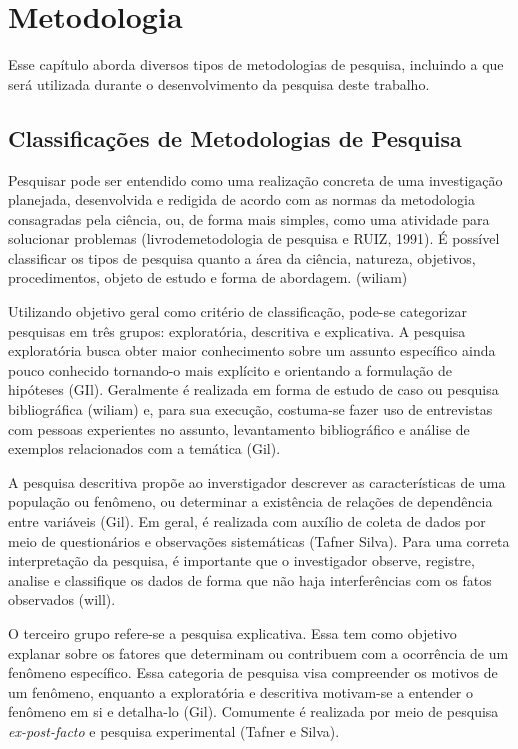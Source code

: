 \chapter[Metodologia]{Metodologia}

Esse capítulo aborda diversos tipos de metodologias de pesquisa, incluindo a que será utilizada durante o desenvolvimento da pesquisa deste trabalho. 

  \section{Classificações de Metodologias de Pesquisa}
  
Pesquisar pode ser entendido como uma realização concreta de uma investigação planejada, desenvolvida e redigida de acordo com as normas da metodologia consagradas pela ciência, ou, de forma mais simples, como uma atividade para solucionar problemas (livrodemetodologia de pesquisa e RUIZ, 1991). É possível classificar os tipos de pesquisa quanto a área da ciência, natureza, objetivos, procedimentos, objeto de estudo e forma de abordagem. (wiliam)  

Utilizando objetivo geral como critério de classificação, pode-se categorizar pesquisas em três grupos: exploratória, descritiva e explicativa. A pesquisa exploratória busca obter maior conhecimento sobre um assunto específico ainda pouco conhecido tornando-o mais explícito e orientando a formulação de hipóteses (GIl). Geralmente é realizada em forma de estudo de caso ou pesquisa bibliográfica (wiliam) e, para sua execução, costuma-se fazer uso de entrevistas com pessoas experientes no assunto, levantamento bibliográfico e análise de exemplos relacionados com a temática (Gil). 

 \par
  \indent A pesquisa descritiva propõe ao inverstigador descrever as características de uma população ou fenômeno, ou determinar a existência de relações de dependência entre variáveis (Gil).  Em geral, é realizada com auxílio de coleta de dados por meio de questionários e observações sistemáticas (Tafner Silva). Para uma correta interpretação da pesquisa, é importante que o investigador observe, registre, analise e classifique os dados de forma que não haja interferências com os fatos observados (will). 

 \par
  \indent O terceiro grupo refere-se a pesquisa explicativa. Essa tem como objetivo explanar sobre os fatores que determinam ou contribuem com  a ocorrência de um fenômeno específico. Essa categoria de pesquisa visa compreender os motivos de um fenômeno, enquanto a exploratória e descritiva motivam-se a entender o fenômeno em si e detalha-lo (Gil). Comumente é realizada por meio de pesquisa \textit{ ex-post-facto} e pesquisa experimental (Tafner e Silva). 

